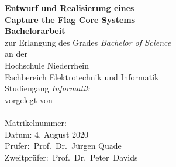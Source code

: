 \begin{titlepage}
	
\begin{center}
		\textbf{\Large Entwurf und Realisierung eines}\\
		\textbf{\Large Capture the Flag Core Systems}\\[3cm]
		\textbf{Bachelorarbeit}\\
		zur Erlangung des Grades {\em Bachelor of Science}\\[1.5cm]
		
		an der\\
		Hochschule Niederrhein\\
		Fachbereich Elektrotechnik und Informatik\\
		Studiengang {\em Informatik}\\[3cm]
		
		vorgelegt von\\
		\thesisAuthor\\
		Matrikelnummer: \Matrikelnummer\\[3cm]
		Datum: 4. August 2020\\[3cm]
		
		Prüfer:~Prof.~Dr.~Jürgen Quade\\
		Zweitprüfer:~Prof.~Dr.~Peter~Davids
	\end{center}
\end{titlepage}